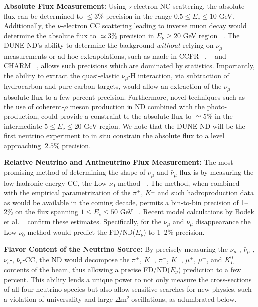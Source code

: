 \vspace{0.25cm} 
\noindent 
{\bf Absolute Flux Measurement:} Using  $\nu$-electron NC scattering, the absolute flux can be determined 
to $\leq 3\%$ precision in the range $0.5 \leq E_\nu \leq 10$ GeV. Additionally, the $\nu$-electron CC scattering leading to  inverse 
muon decay would determine the absolute flux to $\simeq 3\%$ precision in $E_\nu \geq 20$ GeV region 
~\cite{ABS-FLUX}. 
The DUNE-ND's ability to determine the background $without$ relying on $\bar \nu_\mu$ measurements or 
ad hoc extrapolations, such as made in CCFR ~\cite{CCFR-IMD-Mishra-89}, ~\cite{CCFR-IMD-Mishra-90} 
and CHARM ~\cite{CHARM-IMD-95}, allows such precisions which are dominated by statistics. 
Importantly, the ability to extract the quasi-elastic 
$\bar \nu_\mu$-H interaction, via subtraction of hydrocarbon and pure carbon targets, would allow an extraction of 
the $\bar \nu_\mu$ absolute flux to a few percent precision. Furthermore, novel techniques such as the use of 
coherent-$\rho$ meson production in ND combined with the photo-production, could provide a constraint 
to the absolute flux to $\simeq 5\%$ in the intermediate $5 \leq E_\nu \leq 20$ GeV region. 
We note that the DUNE-ND will be the first neutrino experiment to in situ constrain the absolute flux 
to a level approaching $~2.5\%$ precision. 

\vspace{0.25cm} 
 
\noindent 
{\bf Relative Neutrino and Antineutrino Flux Measurement:} The most promising method of determining 
the shape of  $\nu_\mu$ and $\bar \nu_\mu$ flux is by measuring the low-hadronic energy CC, the Low-$\nu_0$ method ~\cite{MISHRA-Nu0}. The method, when combined with the empirical parametrization of the $\pi^{\pm}$, $K^{\pm}$ 
and such hadroproduction data as would be available in the coming decade, permits a bin-to-bin precision of 1--2\% on 
the flux spanning $1 \leq E_\nu \leq 50$ GeV ~\cite{ND-REL-FLUX}. 
Recent model calculations by Bodek et al. ~\cite{BODEK-Nu0} confirm these estimates. 
Specifically, for the $\nu_\mu$ and $\bar \nu_\mu$ disappearance the Low-$\nu_0$ method would predict the 
FD/ND($E_\nu$) to 1--2\% precision. 

\vspace{0.25cm} 
\noindent 
{\bf Flavor Content of the Neutrino Source:} By precisely measuring the $\nu_\mu$-, $\bar \nu_\mu$-, $\nu_e$-, $\bar \nu_e$-CC, 
the ND would decompose the $\pi^+$, $K^+$, $\pi^-$, $K^-$, $\mu^+$, $\mu^-$, and $K^0_L$ contents of the beam, thus 
allowing a precise FD/ND($E_\nu$) prediction to a few percent.  This ability lends a unique power to 
not only measure the cross-sections of all four neutrino species but also allow sensitive searches for new 
physics, such a violation of universality and large-$\Delta$m$^2$ oscillations,  as adumbrated below. 

